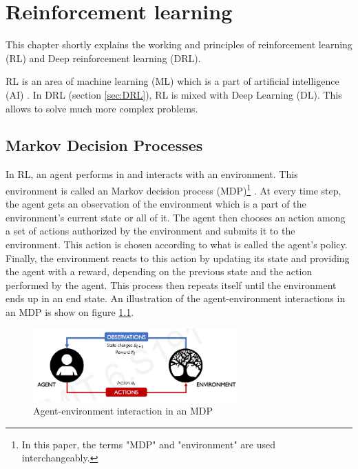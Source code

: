\chapter{Reinforcement learning} \label{chap:RL}

This chapter shortly explains the working and principles of reinforcement learning (RL) and Deep reinforcement learning (DRL).

RL is an area of machine learning (ML)  which is a part of artificial intelligence (AI) . In DRL (section \ref{sec:DRL}), RL is mixed with Deep Learning (DL). This allows to solve much more complex problems.

\section{Markov Decision Processes} \label{sec:MDP}

In RL, an agent performs in and interacts with an environment. This environment is called an Markov decision process (MDP)\footnote{In this paper, the terms "MDP" and "environment" are used interchangeably.} . At every time step, the agent gets an observation of the environment which is a part of the environment's current state or all of it. The agent then chooses an action among a set of actions authorized by the environment and submits it to the environment. This action is chosen according to what is called the agent's policy. Finally, the environment reacts to this action by updating its state and providing the agent with a reward, depending on the previous state and the action performed by the agent. This process then repeats itself until the environment ends up in an end state. An illustration of the agent-environment interactions in an MDP is show on figure \ref{fig:MDP}.\\

\begin{figure}[h!]
    \centering
    \includegraphics[width=0.7\textwidth]{images/MDP.png}
    \caption{Agent-environment interaction in an MDP \cite{MIT:DL}}
    \label{fig:MDP}
\end{figure}

